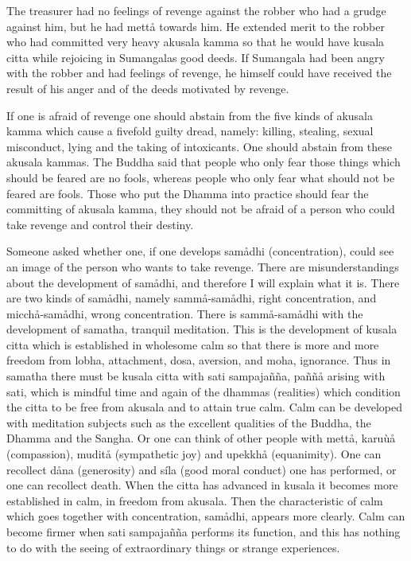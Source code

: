 \documentclass[12pt,twoside]{article}
\begin{document}
The treasurer had no feelings of revenge against the robber who had a
grudge against him, but he had mett{\aa} towards him. He extended merit
to the robber who had committed very heavy akusala kamma so that he
would have kusala citta while rejoicing in Sumangala{\textquotesingle}s
good deeds. If Sumangala had been angry with the robber and had
feelings of revenge, he himself could have received the result of his
anger and of the deeds motivated by revenge. 

If one is afraid of revenge one should abstain from the five kinds of
akusala kamma which cause a fivefold guilty dread, namely: killing,
stealing, sexual misconduct, lying and the taking of intoxicants. One
should abstain from these akusala kammas. The Buddha said that people
who only fear those things which should be feared are no fools, whereas
people who only fear what should not be feared are fools. Those who put
the Dhamma into practice should fear the committing of akusala kamma,
they should not be afraid of a person who could take revenge and
control their destiny. 

Someone asked whether one, if one develops sam{\aa}dhi (concentration),
could see an image of the person who wants to take revenge. There are
misunderstandings about the development of sam{\aa}dhi, and therefore I
will explain what it is. There are two kinds of sam{\aa}dhi, namely
samm{\aa}{}-sam{\aa}dhi, right concentration, and
micch{\aa}{}-sam{\aa}dhi, wrong concentration. There is
samm{\aa}{}-sam{\aa}dhi with the development of samatha, tranquil
meditation. This is the development of kusala citta which is
established in wholesome calm so that there is more and more freedom
from lobha, attachment, dosa, aversion, and moha, ignorance. Thus in
samatha there must be kusala citta with sati sampaja\~n\~na,
pa\~n\~n{\aa} arising with sati, which is mindful time and again of the
dhammas (realities) which condition the citta to be free from akusala
and to attain true calm. Calm can be developed with meditation subjects
such as the excellent qualities of the Buddha, the Dhamma and the
Sangha. Or one can think of other people with mett{\aa}, karu\`u{\aa}
(compassion), mudit{\aa} (sympathetic joy) and upekkh{\aa}
(equanimity). One can recollect d{\aa}na (generosity) and s\'ila (good
moral conduct) one has performed, or one can recollect death. When the
citta has advanced in kusala it becomes more established in calm, in
freedom from akusala. Then the characteristic of calm which goes
together with concentration, sam{\aa}dhi, appears more clearly. Calm
can become firmer when sati sampaja\~n\~na performs its function, and
this has nothing to do with the seeing of extraordinary things or
strange experiences. 
\end{document}
